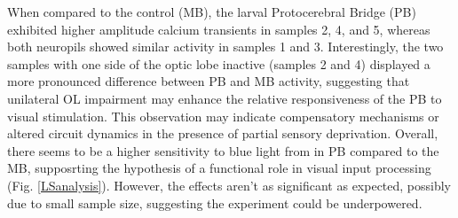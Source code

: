 When compared to the control (MB), the larval Protocerebral Bridge (PB) exhibited higher amplitude calcium transients in samples 2, 4, and 5, whereas both neuropils showed similar activity in samples 1 and 3. Interestingly, the two samples with one side of the optic lobe inactive (samples 2 and 4) displayed a more pronounced difference between PB and MB activity, suggesting that unilateral OL impairment may enhance the relative responsiveness of the PB to visual stimulation. This observation may indicate compensatory mechanisms or altered circuit dynamics in the presence of partial sensory deprivation. 
Overall, there seems to be a higher sensitivity to blue light from in PB compared to the MB, supposrting the hypothesis of a functional role in visual input processing (Fig. \ref{LSanalysis}). However, the effects aren't as significant as expected, possibly due to small sample size, suggesting the experiment could be underpowered.



